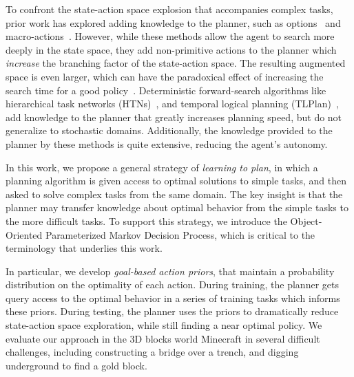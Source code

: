 \documentclass[11pt]{article}
\begin{document}
To confront the state-action space explosion that accompanies complex tasks, prior work has explored adding knowledge to the planner, such as options~\cite{sutton99} and macro-actions~\cite{Botea:2005kx,Newton:2005vn}.  However, while these methods allow the agent to search more deeply in the state space, they add non-primitive actions to the planner which {\em increase} the branching factor of the state-action space.  The resulting augmented space is even larger, which can have the paradoxical effect of increasing the search time for a good policy~\cite{Jong:2008zr}. Deterministic forward-search algorithms like hierarchical task networks (HTNs)~\cite{Nau:1999:SSH:1624312.1624357}, and temporal logical planning (TLPlan)~\cite{Bacchus95usingtemporal,Bacchus99usingtemporal}, add knowledge to the planner that greatly increases planning speed, but do not generalize to stochastic domains. Additionally, the knowledge provided to the planner by these methods is quite extensive, reducing the agent's autonomy.

In this work, we propose a general strategy of {\it learning to plan}, in which a planning algorithm is given access to optimal solutions to simple tasks, and then asked to solve complex tasks from the same domain. The key insight is that the planner may transfer knowledge about optimal behavior from the simple tasks to the more difficult tasks. To support this strategy, we introduce the Object-Oriented Parameterized Markov Decision Process, which is critical to the terminology that underlies this work.

In particular, we develop {\it goal-based action priors}, that maintain a probability distribution on the optimality of each action. During training, the planner gets query access to the optimal behavior in a series of training tasks which informs these priors. During testing, the planner uses the priors to dramatically reduce state-action space exploration, while still finding a near optimal policy. We evaluate our approach in the 3D blocks world Minecraft in several difficult challenges, including constructing a bridge over a trench, and digging underground to find a gold block.
\end{document}
